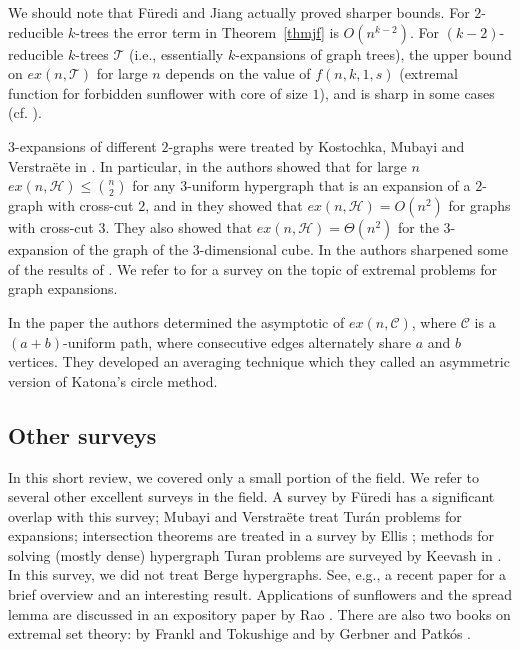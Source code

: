 \documentclass[graybox]{svmult}
\renewcommand{\le}{\leqslant}
\newcommand{\m}{\mathcal}
\begin{document}
We should note that F\"uredi and Jiang \cite{FJ15} actually proved sharper bounds. For $2$-reducible $k$-trees the error term in Theorem~\ref{thmjf} is $O(n^{k-2})$.  For $(k-2)$-reducible $k$-trees $\m T$ (i.e., essentially $k$-expansions of graph trees),  the upper bound on $ex(n,\m T)$ for large $n$ depends on the value of $f(n,k,1,s)$ (extremal function for forbidden sunflower with core of size $1$), and is sharp in some cases (cf. \cite[Theorem 4.5]{FJ15}).


$3$-expansions of different $2$-graphs were treated by Kostochka, Mubayi and Verstra\"ete in \cite{KMV2, KMV3}. In particular, in \cite{KMV2} the authors showed that for large $n$ $ex(n,\m H)\le {n\choose 2}$ for any $3$-uniform hypergraph that is an expansion of a $2$-graph with cross-cut $2$, and in \cite{KMV3} they showed that $ex(n,\m H) = O(n^2)$ for graphs with cross-cut $3$. They also showed that $ex(n,\m H)=\Theta(n^2)$ for the $3$-expansion of the graph of the $3$-dimensional cube. In \cite{LSY} the authors sharpened some of the results of \cite{KMV2}. We refer to \cite{MV} for a survey on the topic of extremal problems for graph expansions.

In the paper \cite{FJKMV} the authors determined the asymptotic of $ex(n, \m C)$, where $\m C$ is a $(a+b)$-uniform path, where consecutive edges alternately share $a$ and $b$ vertices. They developed an averaging technique which they called an asymmetric version of Katona's circle method.





\subsection{Other surveys}
In this short review, we covered only a small portion of the field. We refer to several other excellent surveys in the field. A survey by  F\"uredi \cite{Fur91} has a significant overlap with this survey; Mubayi and Verstra\"ete \cite{MV} treat Tur\'an problems for expansions; intersection theorems are treated in a survey by Ellis \cite{Ell}; methods for solving (mostly dense) hypergraph Turan problems are surveyed by Keevash in \cite{Kee2}. In this survey, we did not treat Berge hypergraphs. See, e.g., a recent paper \cite{FL} for a brief overview and an interesting result. Applications of sunflowers and the spread lemma are discussed in an expository paper by Rao \cite{Rao2}. There are also two books on extremal set theory: by Frankl and Tokushige \cite{FT} and by Gerbner and Patk\'os \cite{GP}.
\end{document}

